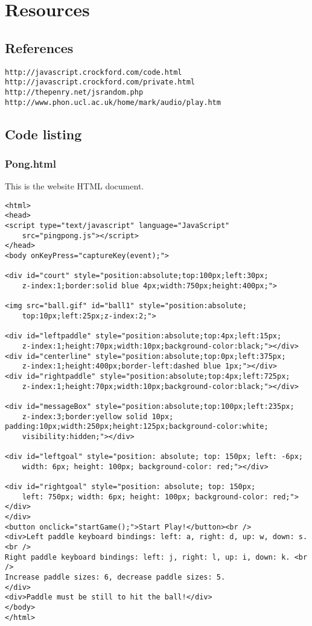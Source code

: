\documentclass[a4paper,10pt]{article}
\begin{document}
\appendix
\section{Resources}
\subsection{References}
\begin{verbatim}
http://javascript.crockford.com/code.html
http://javascript.crockford.com/private.html
http://thepenry.net/jsrandom.php
http://www.phon.ucl.ac.uk/home/mark/audio/play.htm
\end{verbatim}

\subsection{Code listing}

\subsubsection{Pong.html}
This is the website HTML document.

\begin{verbatim}
<html>
<head>
<script type="text/javascript" language="JavaScript" 
    src="pingpong.js"></script>
</head>
<body onKeyPress="captureKey(event);">

<div id="court" style="position:absolute;top:100px;left:30px;
    z-index:1;border:solid blue 4px;width:750px;height:400px;">

<img src="ball.gif" id="ball1" style="position:absolute;
    top:10px;left:25px;z-index:2;">

<div id="leftpaddle" style="position:absolute;top:4px;left:15px;
    z-index:1;height:70px;width:10px;background-color:black;"></div>
<div id="centerline" style="position:absolute;top:0px;left:375px;
    z-index:1;height:400px;border-left:dashed blue 1px;"></div>
<div id="rightpaddle" style="position:absolute;top:4px;left:725px;
    z-index:1;height:70px;width:10px;background-color:black;"></div>

<div id="messageBox" style="position:absolute;top:100px;left:235px;
    z-index:3;border:yellow solid 10px;
padding:10px;width:250px;height:125px;background-color:white;
    visibility:hidden;"></div>

<div id="leftgoal" style="position: absolute; top: 150px; left: -6px; 
    width: 6px; height: 100px; background-color: red;"></div>

<div id="rightgoal" style="position: absolute; top: 150px; 
    left: 750px; width: 6px; height: 100px; background-color: red;"></div>
</div>
<button onclick="startGame();">Start Play!</button><br />
<div>Left paddle keyboard bindings: left: a, right: d, up: w, down: s. <br />
Right paddle keyboard bindings: left: j, right: l, up: i, down: k. <br />
Increase paddle sizes: 6, decrease paddle sizes: 5.
</div>
<div>Paddle must be still to hit the ball!</div>
</body>
</html>
\end{verbatim}
\end{document}

